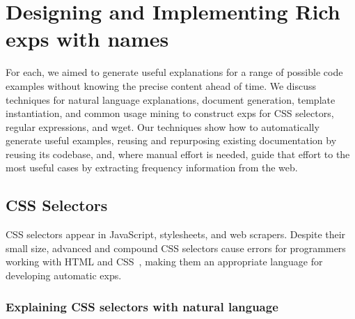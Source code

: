 \section{Designing and Implementing Rich \Glspl{exp} with \Glspl{name}}

For each, we aimed to generate useful explanations for a range of possible code examples without knowing the precise content ahead of time. 
We discuss techniques for natural language explanations, document generation, template instantiation, and common usage mining to construct \glspl{exp} for CSS selectors, regular expressions, and wget.
 Our techniques show how to automatically generate useful examples, reusing and repurposing existing documentation by reusing its codebase, and, where manual effort is needed, guide that effort to the most useful cases by extracting frequency information from the web. \fi

\subsection{CSS Selectors}

CSS selectors appear in JavaScript, stylesheets, and web scrapers.
Despite their small size, advanced and compound CSS selectors cause errors for programmers working with HTML and CSS~\cite{park_towards_2013}, making them an appropriate language for developing automatic \glspl{exp}.

\subsubsection{Explaining CSS selectors with natural language}

